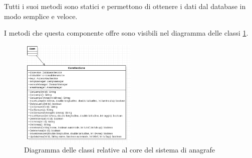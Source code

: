 Tutti i suoi metodi sono statici e permettono di ottenere i dati dal database in modo semplice e veloce.

I metodi che questa componente offre sono visibili nel diagramma delle classi \ref{fig:core_anagrafe}.

\begin{figure}[ht]
    \centering
    \includegraphics[width=0.5\textwidth]{img/core_anagrafe.png}
    \caption{Diagramma delle classi relative al core del sistema di anagrafe}
    \label{fig:core_anagrafe}
\end{figure}
